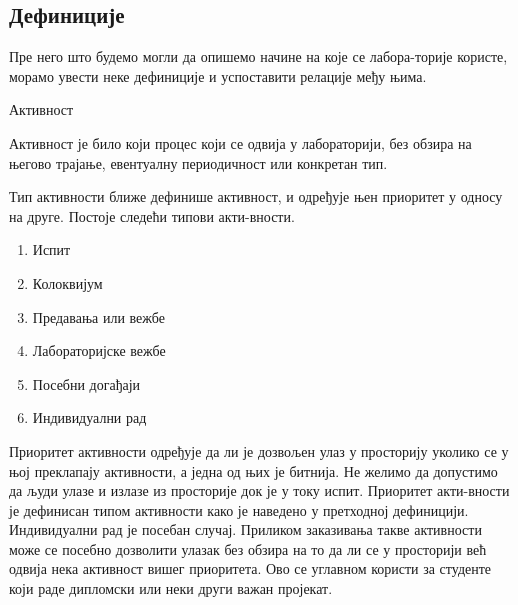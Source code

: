 \documentclass[a4paper, 12pt, diplomski]{etfcyr}
\makeatletter
\newcommand{\indentfirstparagraphoff}{
	\renewenvironment{justify}{%
		\trivlist
		\justifying
		\item\relax
	}{
		\endtrivlist
	}
}
\gdef\tshortstack{\@ifnextchar[\@tshortstack{\@tshortstack[c]}}
\let\@tshortstack\@shortstack
\makeatother
\begin{document}
			\subsection{Дефиниције}

				\begin{justify}
					Пре него што будемо могли да опишемо начине на које се лабора-торије користе, морамо увести неке дефиниције и успоставити релације међу њима.
				\end{justify}

				\begin{labeling}{\smash{\tshortstack[l]{Корисник\\лабораторије}}}
					\indentfirstparagraphoff

					\item [Активност] 
						\begin{justify}
							Активност је било који процес који се одвија у лабораторији, без обзира на његово трајање, евентуалну периодичност или конкретан тип.
						\end{justify}

					\item[\smash{\tshortstack[l]{Тип\\активности}}]
						\begin{justify}
							Тип активности ближе дефинише активност, и одређује њен приоритет у односу на друге. Постоје следећи типови акти-вности.
							\begin{enumerate}[noitemsep]
								\item Испит
								\item Колоквијум
								\item Предавања или вежбе
								\item Лабораторијске вежбе
								\item Посебни догађаји
								\item Индивидуални рад
							\end{enumerate}
						\end{justify}

					\item[\smash{\tshortstack[l]{Приоритет\\активности}}]
						\begin{justify}
							Приоритет активности одређује да ли је дозвољен улаз у просторију уколико се у њој преклапају активности, а једна од њих је битнија. Не желимо да допустимо да људи улазе и излазе из просторије док је у току испит. Приоритет акти-вности је дефинисан типом активности како је наведено у претходној дефиницији.\\
							Индивидуални рад је посебан случај. Приликом заказивања такве активности може се посебно дозволити улазак без обзира на то да ли се у просторији већ одвија нека активност вишег приоритета. Ово се углавном користи за студенте који раде дипломски или неки други важан пројекат.
						\end{justify}


\end{labeling}
\end{document}
